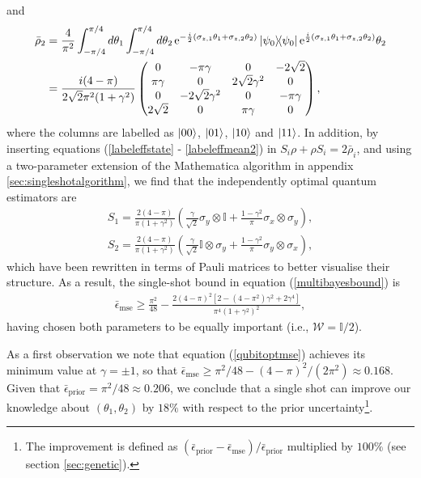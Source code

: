 and
\begin{align}
\bar{\rho}_2 &= \frac{4}{\pi^2}\int_{-\pi/4}^{\pi/4} d\theta_1 \int_{-\pi/4}^{\pi/4} d\theta_2\hspace{0.15em} \mathrm{e}^{-\frac{i}{2}(\sigma_{z,1}\theta_1 + \sigma_{z,2}\theta_2)}\ketbra{\psi_0}\mathrm{e}^{\frac{i}{2}(\sigma_{z,1}\theta_1 + \sigma_{z,2}\theta_2)}\theta_2
\nonumber \\
&= \frac{i(4-\pi)}{2\sqrt{2}\pi^2(1+\gamma^2)}
\begin{pmatrix}
0 & -\pi\gamma & 0 & -2\sqrt{2} \\
\pi\gamma & 0 & 2\sqrt{2}\gamma^2 & 0 \\
0 & -2\sqrt{2}\gamma^2 & 0 & -\pi\gamma \\
2\sqrt{2} & 0 & \pi\gamma & 0 
\end{pmatrix},
\label{labeleffmean2}
\end{align}
where the columns are labelled as $\ket{00}$, $\ket{01}$, $\ket{10}$ and $\ket{11}$. In addition, by inserting equations (\ref{labeleffstate} - \ref{labeleffmean2}) in $S_i\rho + \rho S_i = 2\bar{\rho}_i$, and using a two-parameter extension of the Mathematica algorithm in appendix \ref{sec:singleshotalgorithm}, we find that the independently optimal quantum estimators are
\begin{eqnarray}
S_1 = \frac{2 \left(4-\pi\right)}{\pi\left(1+\gamma^2\right)}\left( \frac{\gamma}{\sqrt{2}} \sigma_y\otimes\mathbb{I} + \frac{1-\gamma^2}{\pi}\sigma_x\otimes\sigma_y \right),
\label{qest1}
\end{eqnarray}
\begin{eqnarray}
S_2 = \frac{2 \left(4-\pi\right)}{\pi\left(1+\gamma^2\right)}\left( \frac{\gamma}{\sqrt{2}} \mathbb{I}\otimes\sigma_y + \frac{1-\gamma^2}{\pi}\sigma_y\otimes\sigma_x \right), 
\label{qest2}
\end{eqnarray}
which have been rewritten in terms of Pauli matrices to better visualise their structure. As a result, the single-shot bound in equation (\ref{multibayesbound}) is
\begin{eqnarray}
\bar{\epsilon}_{\mathrm{mse}} \geqslant \frac{\pi^2}{48} - \frac{2\left(4-\pi\right)^2\left[2-\left(4-\pi^2\right)\gamma^2 + 2\gamma^4 \right]}{\pi^4 \left(1+\gamma^2\right)^2},
\label{qubitoptmse}
\end{eqnarray}
having chosen both parameters to be equally important (i.e., $\mathcal{W} = \mathbb{I}/2$). 

As a first observation we note that equation (\ref{qubitoptmse}) achieves its minimum value at $\gamma = \pm 1$, so that $\bar{\epsilon}_{\mathrm{mse}} \geqslant \pi^2/48 - (4-\pi)^2/(2\pi^2) \approx 0.168$. Given that $\bar{\epsilon}_{\mathrm{prior}} = \pi^2/48 \approx 0.206$, we conclude that a single shot can improve our knowledge about $(\theta_1, \theta_2)$ by $18\%$ with respect to the prior uncertainty\footnote{The improvement is defined as $(\bar{\epsilon}_{\mathrm{prior}}-\bar{\epsilon}_{\mathrm{mse}})/\bar{\epsilon}_{\mathrm{prior}}$ multiplied by $100\%$ (see section \ref{sec:genetic}).}.

